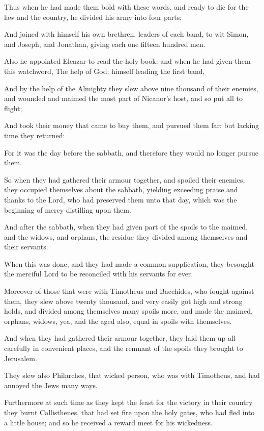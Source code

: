 {\par }{\PP {}Thus when he had made them bold with these words, and ready to die for the law and the country, he divided his army into four parts;
\par }{\PP {}And joined with himself his own brethren, leaders of each band, to wit Simon, and Joseph, and Jonathan, giving each one fifteen hundred men.
\par }{\PP {}Also he appointed Eleazar to read the holy book: and when he had given them this watchword, The help of God; himself leading the first band,
\par }{\PP {}And by the help of the Almighty they slew above nine thousand of their enemies, and wounded and maimed the most part of Nicanor’s host, and so put all to flight;
\par }{\PP {}And took their money that came to buy them, and pursued them far: but lacking time they returned:
\par }{\PP {}For it was the day before the sabbath, and therefore they would no longer pursue them.
\par }{\PP {}So when they had gathered their armour together, and spoiled their enemies, they occupied themselves about the sabbath, yielding exceeding praise and thanks to the Lord, who had preserved them unto that day, which was the beginning of mercy distilling upon them.
\par }{\PP {}And after the sabbath, when they had given part of the spoils to the maimed, and the widows, and orphans, the residue they divided among themselves and their servants.
\par }{\PP {}When this was done, and they had made a common supplication, they besought the merciful Lord to be reconciled with his servants for ever.
\par }{\PP {}Moreover of those that were with Timotheus and Bacchides, who fought against them, they slew above twenty thousand, and very easily got high and strong holds, and divided among themselves many spoils more, and made the maimed, orphans, widows, yea, and the aged also, equal in spoils with themselves.
\par }{\PP {}And when they had gathered their armour together, they laid them up all carefully in convenient places, and the remnant of the spoils they brought to Jerusalem.
\par }{\PP {}They slew also Philarches, that wicked person, who was with Timotheus, and had annoyed the Jews many ways.
\par }{\PP {}Furthermore at such time as they kept the feast for the victory in their country they burnt Callisthenes, that had set fire upon the holy gates, who had fled into a little house; and so he received a reward meet for his wickedness.
}
